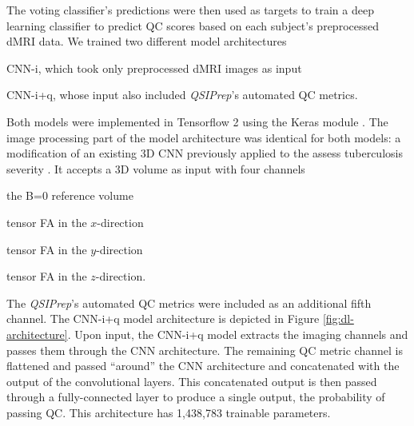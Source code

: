 \documentclass[fleqn,10pt]{wlscirep}
\begin{document}
The voting classifier's predictions were then used as targets to train a deep
learning classifier to predict QC scores based on each subject's preprocessed
dMRI data. We trained two different model architectures
\begin{enumerate*}[%
    label=(\roman*),%
    before=\unskip{: },%
    itemjoin={{, }},%
    itemjoin*={{ and }}]
    \item CNN-i, which took only preprocessed dMRI images as input
    \item CNN-i+q, whose input also included \emph{QSIPrep}'s automated QC metrics.
\end{enumerate*}
Both models were implemented in Tensorflow 2 \cite{tensorflow} using the Keras
module \cite{keras}. The image processing part of the model architecture was
identical for both models: a modification of an existing 3D CNN
\cite{zunair2020-bs} previously applied to the assess tuberculosis severity
\cite{dicente2019clef}. It accepts a 3D volume as input with four channels
\begin{enumerate*}[%
    label=(\roman*),%
    before=\unskip{: },%
    itemjoin={{, }},%
    itemjoin*={{ and }}]
    \item the B=0 reference volume
    \item tensor FA in the $x$-direction
    \item tensor FA in the $y$-direction
    \item tensor FA in the $z$-direction.
\end{enumerate*}
The \emph{QSIPrep}'s automated QC metrics were included as an additional fifth
channel. The CNN-i+q model architecture is depicted in Figure
\ref{fig:dl-architecture}. Upon input, the CNN-i+q model extracts the imaging
channels and passes them through the CNN architecture. The remaining QC metric
channel is flattened and passed ``around'' the CNN architecture and concatenated
with the output of the convolutional layers. This concatenated output is then
passed through a fully-connected layer to produce a single output, the
probability of passing QC. This architecture has 1,438,783 trainable parameters.
\end{document}
